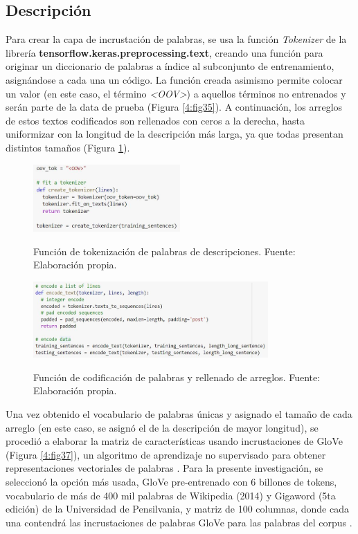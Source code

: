 \subsection{Descripción}
Para crear la capa de incrustación de palabras, se usa la función \textit{Tokenizer} de la librería \textbf{tensorflow.keras.preprocessing.text}, creando una función para originar un diccionario de palabras a índice al subconjunto de entrenamiento, asignándose a cada una un código. La función creada asimismo permite colocar un valor (en este caso, el término \textit{<OOV>}) a aquellos términos no entrenados y serán parte de la data de prueba (Figura \ref{4:fig35}). A continuación, los arreglos de estos textos codificados son rellenados con ceros a la derecha, hasta uniformizar con la longitud de la descripción más larga, ya que todas presentan distintos tamaños (Figura \ref{4:fig36}).

\begin{figure}[htbp]
	\begin{center}
		\includegraphics[width=0.50\textwidth]{4/figures/description_tokenizer_function.jpg}
		\caption{Función de tokenización de palabras de descripciones. Fuente: Elaboración propia.}
		\label{4:fig35}
		\includegraphics[width=0.80\textwidth]{4/figures/description_encoder_function.jpg}
		\caption{Función de codificación de palabras y rellenado de arreglos. Fuente: Elaboración propia.}
		\label{4:fig36}
	\end{center}
\end{figure}

Una vez obtenido el vocabulario de palabras únicas y asignado el tamaño de cada arreglo (en este caso, se asignó el de la descripción de mayor longitud), se procedió a elaborar la matriz de características usando incrustaciones de GloVe (Figura \ref{4:fig37}), un algoritmo de aprendizaje no supervisado para obtener representaciones vectoriales de palabras \parencite{gl_pennington_glove}. Para la presente investigación, se seleccionó la opción más usada, GloVe pre-entrenado con 6 billones de tokens, vocabulario de más de 400 mil palabras de Wikipedia (2014) y Gigaword (5ta edición) de la Universidad de Pensilvania, y matriz de 100 columnas, donde cada una contendrá las incrustaciones de palabras GloVe para las palabras del corpus \parencite{tec_malik2019pythonnlp}.

